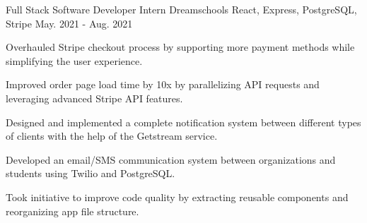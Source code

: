 \begin{cventries}
  \cventry
    {Full Stack Software Developer Intern} %
    {Dreamschools} %
    {React, Express, PostgreSQL, Stripe} %
    {May. 2021 - Aug. 2021} %
    {
      \begin{cvitems} %
        \item {Overhauled Stripe checkout process by supporting more payment methods while simplifying the user experience.}
        \item {Improved order page load time by 10x by parallelizing API requests and leveraging advanced Stripe API features.}
        \item {Designed and implemented a complete notification system between  different types of clients with the help of the Getstream service.}
        \item {Developed an email/SMS communication system between organizations and students using Twilio and PostgreSQL.}
        \item {Took initiative to improve code quality by extracting reusable components and reorganizing app file structure.}
      \end{cvitems}
    }
\end{cventries}
